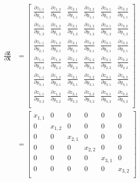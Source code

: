 \documentclass{article}
\newcommand{\matr}[1]{\mathbf{#1}} %
\begin{document}
\begin{align}
\frac{\partial \matr{Z}}{\partial \matr{X}} &=
\begin{bmatrix}
\frac{\partial z_{1,1}}{\partial y_{1,1}} & \frac{\partial z_{1,2}}{\partial y_{1,1}} & \frac{\partial z_{2,1}}{\partial y_{1,1}} & \frac{\partial z_{2,2}}{\partial y_{1,1}} & \frac{\partial z_{3,1}}{\partial y_{1,1}} & \frac{\partial z_{3,2}}{\partial y_{1,1}}\\[0.7em]
\frac{\partial z_{1,1}}{\partial y_{1,2}} & \frac{\partial z_{1,2}}{\partial y_{1,2}} & \frac{\partial z_{2,1}}{\partial y_{1,2}} & \frac{\partial z_{2,2}}{\partial y_{1,2}} & \frac{\partial z_{3,1}}{\partial y_{1,2}} & \frac{\partial z_{3,2}}{\partial y_{1,2}}\\[0.7em]
\frac{\partial z_{1,1}}{\partial y_{2,1}} & \frac{\partial z_{1,2}}{\partial y_{2,1}} & \frac{\partial z_{2,1}}{\partial y_{2,1}} & \frac{\partial z_{2,2}}{\partial y_{2,1}} & \frac{\partial z_{3,1}}{\partial y_{2,1}} & \frac{\partial z_{3,2}}{\partial y_{2,1}}\\[0.7em]
\frac{\partial z_{1,1}}{\partial y_{2,2}} & \frac{\partial z_{1,2}}{\partial y_{2,2}} & \frac{\partial z_{2,1}}{\partial y_{2,2}} & \frac{\partial z_{2,2}}{\partial y_{2,2}} & \frac{\partial z_{3,1}}{\partial y_{2,2}} & \frac{\partial z_{3,2}}{\partial y_{2,2}}\\[0.7em]
\frac{\partial z_{1,1}}{\partial y_{3,1}} & \frac{\partial z_{1,2}}{\partial y_{3,1}} & \frac{\partial z_{2,1}}{\partial y_{3,1}} & \frac{\partial z_{2,2}}{\partial y_{3,1}} & \frac{\partial z_{3,1}}{\partial y_{3,1}} & \frac{\partial z_{3,2}}{\partial y_{3,1}}\\[0.7em]
\frac{\partial z_{1,1}}{\partial y_{3,2}} & \frac{\partial z_{1,2}}{\partial y_{3,2}} & \frac{\partial z_{2,1}}{\partial y_{3,2}} & \frac{\partial z_{2,2}}{\partial y_{3,2}} & \frac{\partial z_{3,1}}{\partial y_{3,2}} & \frac{\partial z_{3,2}}{\partial y_{3,2}}\\[0.7em]
\end{bmatrix} \nonumber
\\ \label{dZbydY_hadamard_product}
&=
\begin{bmatrix}
x_{1,1} & 0 & 0 & 0 & 0 & 0 \\[0.5em]
0 & x_{1,2} & 0 & 0 & 0 & 0 \\[0.5em]
0 & 0 & x_{2,1} & 0 & 0 & 0 \\[0.5em]
0 & 0 & 0 & x_{2,2} & 0 & 0 \\[0.5em]
0 & 0 & 0 & 0 & x_{3,1} & 0 \\[0.5em]
0 & 0 & 0 & 0 & 0 & x_{3,2} \\[0.5em]
\end{bmatrix}
\end{align}
\end{document}
